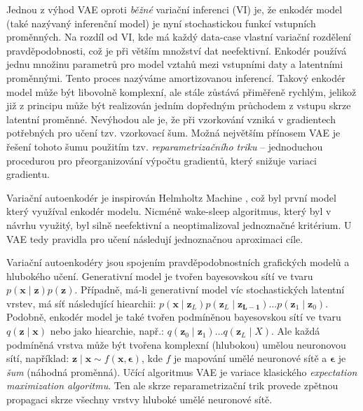 Jednou z výhod VAE oproti \emph{běžné} variační inferenci (VI) je, že enkodér model (také nazývaný inferenční model) je nyní stochastickou funkcí vstupních proměnných.
Na rozdíl od VI, kde má každý data-case vlastní variační rozdělení pravděpodobnosti, což je při větším množství dat neefektivní.
Enkodér používá jednu množinu parametrů pro model vztahů mezi vstupními daty a latentními proměnnými. Tento proces nazýváme amortizovanou inferencí.
Takový enkodér model může být libovolně komplexní, ale stále zůstává přiměřeně rychlým, jelikož již z principu může být realizován jedním dopředným průchodem z vstupu skrze latentní proměnné.
Nevýhodou ale je, že při vzorkování vzniká v gradientech potřebných pro učení tzv. vzorkovací šum. Možná největším přínosem VAE je řešení tohoto šumu použitím tzv. \emph{reparametrizačního triku} – jednoduchou procedurou pro přeorganizování výpočtu gradientů, který snižuje variaci gradientu.

Variační autoenkodér je inspirován Helmholtz Machine \cite{Dayan1995}, což byl první model který využíval enkodér modelu.
Nicméně wake-sleep algoritmus, který byl v návrhu využitý, byl silně neefektivní a neoptimalizoval jednoznačné kritérium.
U VAE tedy pravidla pro učení následují jednoznačnou aproximaci cíle.

Variační autoenkodéry jsou spojením pravděpodobnostních grafických modelů a hlubokého učení.
Generativní model je tvořen bayesovskou sítí ve tvaru $p(\mathbf{x}\mid\mathbf{z})p(\mathbf{z})$. Případně, má-li generativní model víc stochastických latentní vrstev, má síť následující hiearchii: $p(\mathbf{x}\mid\mathbf{z}_L) p(\mathbf{z}_L\mid\mathbf{z_{L-1}}) \dots p(\mathbf{z}_1\mid\mathbf{z}_0)$.
Podobně, enkodér model je také tvořen podmíněnou bayesovskou sítí ve tvaru $q(\mathbf{z}\mid\mathbf{x})$ nebo jako hiearchie, např.: $q(\mathbf{z}_0\mid\mathbf{z}_1) \dots q(\mathbf{z}_L \mid X)$.
Ale každá podmíněná vrstva může být tvořena komplexní (hlubokou) umělou neuronovou sítí, například: $\mathbf{z}\mid\mathbf{x} \sim f(\mathbf{x}, \mathbf{\epsilon})$, kde $f$ je mapování umělé neuronové sítě a $\mathbf{\epsilon}$ je \emph{šum} (náhodná proměnná).
Učící algoritmus VAE je variace klasického \emph{expectation maximization algoritmu}. Ten ale skrze reparametrizační trik provede zpětnou propagaci skrze všechny vrstvy hluboké umělé neuronové sítě.